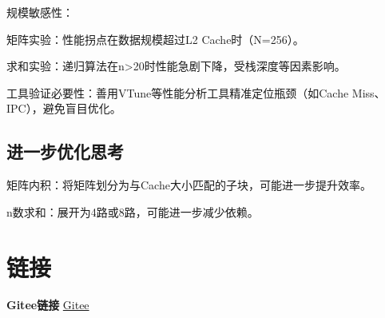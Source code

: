 \documentclass[a4paper]{article}
\begin{document}
规模敏感性：

矩阵实验：性能拐点在数据规模超过L2 Cache时（N=256）。

求和实验：递归算法在n>20时性能急剧下降，受栈深度等因素影响。

工具验证必要性：善用VTune等性能分析工具精准定位瓶颈（如Cache Miss、IPC），避免盲目优化。
\subsection{进一步优化思考}
矩阵内积：将矩阵划分为与Cache大小匹配的子块，可能进一步提升效率。

n数求和：展开为4路或8路，可能进一步减少依赖。

\section{链接}
\textbf{Gitee链接}  \href{https://gitee.com/sky_whale/parallel-programming-with-nku}{Gitee}
\end{document}
